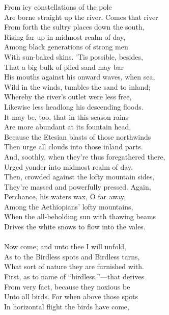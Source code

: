 From icy constellations of the pole\\
Are borne straight up the river. Comes that river\\
From forth the sultry places down the south,\\
Rising far up in midmost realm of day,\\
Among black generations of strong men\\
With sun-baked skins. 'Tis possible, besides,\\
That a big bulk of piled sand may bar\\
His mouths against his onward waves, when sea,\\
Wild in the winds, tumbles the sand to inland;\\
Whereby the river's outlet were less free,\\
Likewise less headlong his descending floods.\\
It may be, too, that in this season rains\\
Are more abundant at its fountain head,\\
Because the Etesian blasts of those northwinds\\
Then urge all clouds into those inland parts.\\
And, soothly, when they're thus foregathered there,\\
Urged yonder into midmost realm of day,\\
Then, crowded against the lofty mountain sides,\\
They're massed and powerfully pressed. Again,\\
Perchance, his waters wax, O far away,\\
Among the Aethiopians' lofty mountains,\\
When the all-beholding sun with thawing beams\\
Drives the white snows to flow into the vales.\\
\\
Now come; and unto thee I will unfold,\\
As to the Birdless spots and Birdless tarns,\\
What sort of nature they are furnished with.\\
First, as to name of ``birdless,''—that derives\\
From very fact, because they noxious be\\
Unto all birds. For when above those spots\\
In horizontal flight the birds have come,\\
